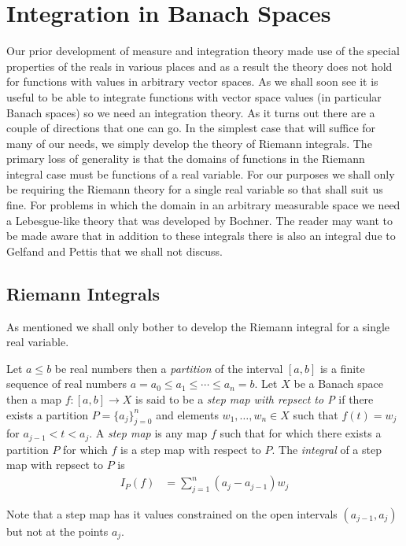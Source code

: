 \section{Integration in Banach Spaces}

Our prior development of measure and integration theory made use of the
special properties of the reals in various places and as a
result the theory does not hold for functions with values in arbitrary
vector spaces.  As we shall soon see it is useful to be able to
integrate functions with vector space values (in particular Banach
spaces) so we need an integration theory.  As it turns out there are a
couple of directions that one can go.  In the simplest case that will
suffice for many of our needs, we simply develop the theory of Riemann
integrals.  The primary loss of generality is
that the domains of functions in the Riemann integral case must be 
functions of a real variable.  For our purposes we shall only be
requiring the Riemann theory for a single real variable so that shall
suit us fine.  For problems in which the domain in an arbitrary
measurable space we need a Lebesgue-like theory that was developed by
Bochner.  The reader may want to be made aware that in addition to these integrals there is also an
integral due to Gelfand and Pettis that we shall not discuss.

\subsection{Riemann Integrals}
As mentioned we shall only bother to develop the Riemann integral for
a single real variable.
\begin{defn}Let $a \leq b$ be real numbers then a \emph{partition} of
  the interval $[a,b]$ is a finite sequence of real numbers $a=a_0
  \leq a_1 \leq \dotsb \leq a_n = b$.  Let $X$ be a Banach space then
  a map $f : [a,b] \to X$ is said to be a \emph{step map with repsect
    to P} if there
  exists a partition $P=\lbrace a_j \rbrace_{j=0}^n$ and elements $w_1,
  \dotsc, w_n \in X$ such that $f(t) = w_j$ for $a_{j-1} < t < a_j$.
  A \emph{step map} is any map $f$ such that for which there exists a partition
  $P$ for which $f$ is a step map with respect to $P$.
  The \emph{integral} of a step map with repsect to $P$ is
\begin{align*}
I_P(f) &= 
\sum_{j=1}^n (a_j - a_{j-1}) w_j
\end{align*}
\end{defn}
Note that a step map has it values constrained on the open intervals
$(a_{j-1},a_j)$ but not at the points $a_j$.

